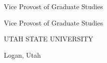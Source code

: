 {\begin{titlepage}
		\ifodd\value{thesis@usu@sig}%
			\thesis@usu@sigbox{\thesis@usu@viceprovost}%
				{Vice Provost of Graduate Studies}%
			\par
		\else
			{\centering
				\thesis@usu@sigboxc{\thesis@usu@viceprovost}%
					{Vice Provost of Graduate Studies}%
			\par}%
		\fi
		\endgroup
		\vspace{3\baselineskip}
		{\centering
			UTAH STATE UNIVERSITY\par
			Logan, Utah\par
			\vspace{\baselineskip}
			\thesis@usu@year\par
		\par}
		\vspace*{\fill}
	\end{titlepage}%
}

%
\thesisnoapprovalpage
